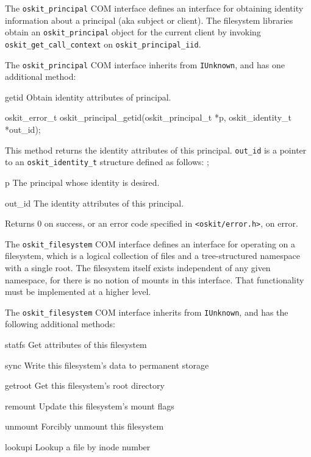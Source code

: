 	The {\tt oskit_principal} COM interface defines an interface for
obtaining identity information about a principal (aka subject or
client).  The filesystem libraries obtain an {\tt oskit_principal} object for
the current client by invoking {\tt oskit_get_call_context} on
{\tt oskit_principal_iid}.

	The {\tt oskit_principal} COM interface inherits from {\tt IUnknown},
and has one additional method:
\begin{icsymlist}
\item[getid]
	Obtain identity attributes of principal.
\end{icsymlist}

\begin{apisyn}

	\funcproto oskit_error_t
	oskit_principal_getid(oskit_principal_t *p,
			     \outparam oskit_identity_t *out_id);
\end{apisyn}
\fstoos
\begin{apidesc}
	This method returns the identity attributes of this principal.
	{\tt out_id} is a pointer to an {\tt oskit_identity_t} structure defined
	as follows:
	;
\end{apidesc}
\begin{apiparm}
	\item[p]
		The principal whose identity is desired.
	\item[out_id]
		The identity attributes of this principal.
\end{apiparm}
\begin{apiret}
	Returns 0 on success, or an error code specified in
	{\tt <oskit/error.h>}, on error.
\end{apiret}



The {\tt oskit_filesystem} COM interface defines an interface for
operating on a filesystem, which is a logical collection of files and
a tree-structured namespace with a single root.  The filesystem
itself exists independent of any given namespace,
for there is no notion of mounts in this interface.
That functionality must be implemented at a higher level.

The {\tt oskit_filesystem} COM interface inherits from {\tt IUnknown},
and has the following additional methods:	
\begin{icsymlist}
\item[statfs]
	Get attributes of this filesystem
\item[sync]	
	Write this filesystem's data to permanent storage
\item[getroot]
	Get this filesystem's root directory
\item[remount]
	Update this filesystem's mount flags 
\item[unmount]
	Forcibly unmount this filesystem
\item[lookupi]
	Lookup a file by inode number
\end{icsymlist}

